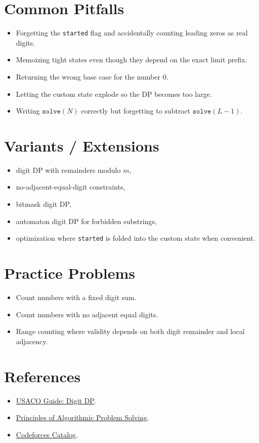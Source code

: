 \section*{Common Pitfalls}

\begin{itemize}
  \item Forgetting the \texttt{started} flag and accidentally counting leading zeros as real digits.
  \item Memoizing tight states even though they depend on the exact limit prefix.
  \item Returning the wrong base case for the number \(0\).
  \item Letting the custom state explode so the DP becomes too large.
  \item Writing \(\texttt{solve}(N)\) correctly but forgetting to subtract \(\texttt{solve}(L - 1)\).
\end{itemize}

\section*{Variants / Extensions}

\begin{itemize}
  \item digit DP with remainders modulo \(m\),
  \item no-adjacent-equal-digit constraints,
  \item bitmask digit DP,
  \item automaton digit DP for forbidden substrings,
  \item optimization where \texttt{started} is folded into the custom state when convenient.
\end{itemize}

\section*{Practice Problems}

\begin{itemize}
  \item Count numbers with a fixed digit sum.
  \item Count numbers with no adjacent equal digits.
  \item Range counting where validity depends on both digit remainder and local adjacency.
\end{itemize}

\section*{References}

\begin{itemize}
  \item \href{https://usaco.guide/gold/digit-dp?lang=cpp}{USACO Guide: Digit DP}.
  \item \href{https://usaco.guide/PAPS.pdf}{Principles of Algorithmic Problem Solving}.
  \item \href{https://codeforces.com/catalog}{Codeforces Catalog}.
\end{itemize}
